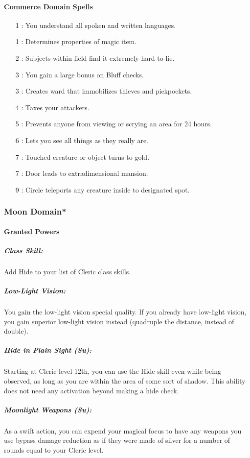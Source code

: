 \paragraph{Commerce Domain Spells}
\begin{itemize}
\item[1] : You understand all spoken and written languages.
\item[1] : Determines properties of magic item.
\item[2] : Subjects within field find it extremely hard to lie.
\item[3] : You gain a large bonus on Bluff checks.
\item[3] : Creates ward that immobilizes thieves and pickpockets.
\item[4] : Taxes your attackers.
\item[5] : Prevents anyone from viewing or scrying an area for 24 hours.
\item[6] : Lets you see all things as they really are.
\item[7] : Touched creature or object turns to gold.
\item[7] : Door leads to extradimensional mansion.
\item[9] : Circle teleports any creature inside to designated spot.
\end{itemize}
\subsubsection[Moon Domain]{Moon Domain*}
\paragraph{Granted Powers}
\subparagraph{Class Skill:}
Add Hide to your list of Cleric class skills.
\subparagraph{Low-Light Vision:} You gain the low-light vision special quality. If you already have low-light vision, you gain superior low-light vision instead (quadruple the distance, instead of double).
\subparagraph{Hide in Plain Sight (Su):} Starting at Cleric level 12th, you can use the Hide skill even while being observed, as long as you are within the area of some sort of shadow.
This ability does not need any activation beyond making a hide check.
\subparagraph{Moonlight Weapons (Su):}
As a swift action, you can expend your magical focus to have any weapons you use bypass damage reduction as if they were made of silver for a number of rounds equal to your Cleric level.
